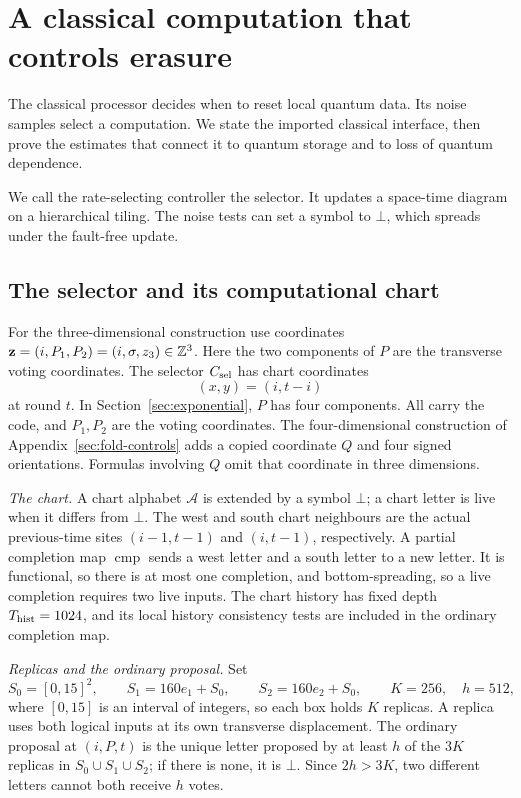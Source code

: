 \section{A classical computation that controls erasure}\label{sec:controller}

The classical processor decides when to reset local quantum data. Its noise samples select a computation. We state the imported classical interface, then prove the estimates that connect it to quantum storage and to loss of quantum dependence.

We call the rate-selecting controller the selector. It updates a space-time diagram on a hierarchical tiling. The noise tests can set a symbol to \(\bot\), which spreads under the fault-free update.

\subsection{The selector and its computational chart}\label{c:chart}
For the three-dimensional construction use coordinates
\({\bf z}=(i,P_1,P_2)=(i,\sigma,z_3)\in\mathbb Z^3\).
Here the two components of \(P\) are the transverse voting coordinates.
The selector \(C_{\rm sel}\) has chart coordinates
\[
 (x,y)=(i,t-i)
\]
at round \(t\).
In Section~\ref{sec:exponential}, \(P\) has four components. All carry the code, and \(P_1,P_2\) are the voting coordinates. The four-dimensional construction of Appendix~\ref{sec:fold-controls} adds a copied coordinate \(Q\) and four signed orientations. Formulas involving \(Q\) omit that coordinate in three dimensions.
\par\emph{The chart.} A chart alphabet \(\mathcal A\) is extended by a symbol \(\bot\); a chart letter is live when it differs from \(\bot\). The west and south chart neighbours are the actual previous-time sites \((i-1,t-1)\) and \((i,t-1)\), respectively. A partial completion map \(\operatorname{cmp}\) sends a west letter and a south letter to a new letter. It is functional, so there is at most one completion, and bottom-spreading, so a live completion requires two live inputs. The chart history has fixed depth \(T_{\rm hist}=1024\), and its local history consistency tests are included in the ordinary completion map.

\emph{Replicas and the ordinary proposal.} Set
\begin{equation}\label{eq:c-boxes}
 S_0=[0,15]^2,\qquad S_1=160e_1+S_0,\qquad S_2=160e_2+S_0,\qquad K=256,\quad h=512,
\end{equation}
where \([0,15]\) is an interval of integers, so each box holds \(K\) replicas. A replica uses both logical inputs at its own transverse displacement. The ordinary proposal at \((i,P,t)\) is the unique letter proposed by at least \(h\) of the \(3K\) replicas in \(S_0\cup S_1\cup S_2\); if there is none, it is \(\bot\). Since \(2h>3K\), two different letters cannot both receive \(h\) votes.

